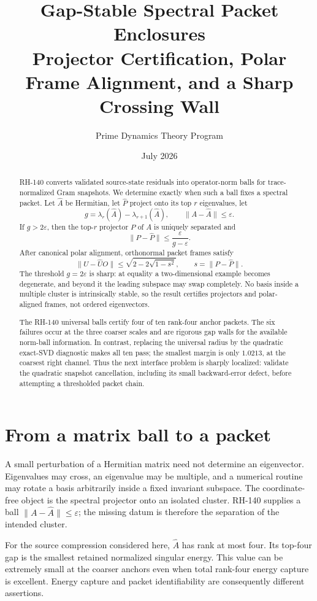 \documentclass[12pt]{article}
\title{Gap-Stable Spectral Packet Enclosures\\\large Projector Certification, Polar Frame Alignment, and a Sharp Crossing Wall}
\author{Prime Dynamics Theory Program}
\date{July 2026}
\begin{document}
\maketitle

\begin{abstract}
RH-140 converts validated source-state residuals into operator-norm balls for
trace-normalized Gram snapshots.  We determine exactly when such a ball fixes
a spectral packet.  Let $\widehat A$ be Hermitian, let $\widehat P$ project
onto its top $r$ eigenvalues, let
\[
 g=\lambda_r(\widehat A)-\lambda_{r+1}(\widehat A),
 \qquad \|A-\widehat A\|\leq\varepsilon.
\]
If $g>2\varepsilon$, then the top-$r$ projector $P$ of $A$ is uniquely
separated and
\[
 \|P-\widehat P\|\leq\frac{\varepsilon}{g-\varepsilon}.
\]
After canonical polar alignment, orthonormal packet frames satisfy
\[
 \|U-\widehat UO\|
 \leq\sqrt{2-2\sqrt{1-s^2}},
 \qquad s=\|P-\widehat P\|.
\]
The threshold $g=2\varepsilon$ is sharp: at equality a two-dimensional
example becomes degenerate, and beyond it the leading subspace may swap
completely.  No basis inside a multiple cluster is intrinsically stable, so
the result certifies projectors and polar-aligned frames, not ordered
eigenvectors.

The RH-140 universal balls certify four of ten rank-four anchor packets.
The six failures occur at the three coarser scales and are rigorous gap walls
for the available norm-ball information.  In contrast, replacing the
universal radius by the quadratic exact-SVD diagnostic makes all ten pass;
the smallest margin is only $1.0213$, at the coarsest right channel.  Thus
the next interface problem is sharply localized: validate the quadratic
snapshot cancellation, including its small backward-error defect, before
attempting a thresholded packet chain.
\end{abstract}

\section{From a matrix ball to a packet}
A small perturbation of a Hermitian matrix need not determine an eigenvector.
Eigenvalues may cross, an eigenvalue may be multiple, and a numerical routine
may rotate a basis arbitrarily inside a fixed invariant subspace.  The
coordinate-free object is the spectral projector onto an isolated cluster.
RH-140 supplies a ball $\|A-\widehat A\|\leq\varepsilon$; the missing datum is
therefore the separation of the intended cluster.

For the source compression considered here, $\widehat A$ has rank at most
four.  Its top-four gap is the smallest retained normalized singular energy.
This value can be extremely small at the coarser anchors even when total
rank-four energy capture is excellent.  Energy capture and packet
identifiability are consequently different assertions.
\end{document}
